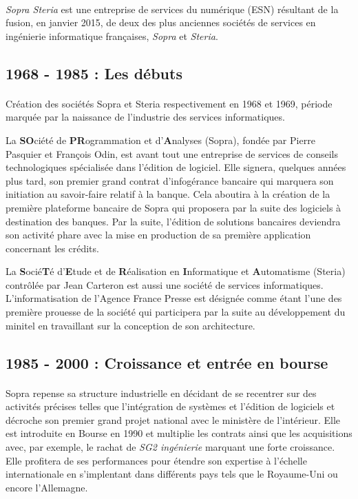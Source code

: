 \paragraph{}
\textit{Sopra Steria} est une entreprise de services du numérique (ESN) résultant de la fusion, en janvier 2015, de deux des plus anciennes sociétés de services en ingénierie informatique françaises, \textit{Sopra} et \textit{Steria}.

\subsection{1968 - 1985 : Les débuts}

\paragraph{}
Création des sociétés Sopra et Steria respectivement en 1968 et 1969, période marquée par la naissance de l'industrie des services informatiques.

La \textbf{SO}ciété de \textbf{PR}ogrammation et d'\textbf{A}nalyses (Sopra), fondée par Pierre Pasquier et François Odin, est avant tout une entreprise de services de conseils technologiques spécialisée dans l'édition de logiciel. Elle signera, quelques années plus tard, son premier grand contrat d'infogérance bancaire qui marquera son initiation au savoir-faire relatif à la banque. Cela aboutira à la création de la première plateforme bancaire de Sopra qui proposera par la suite des logiciels à destination des banques. Par la suite, l'édition de solutions bancaires deviendra son activité phare avec la mise en production de sa première application concernant les crédits.

La \textbf{S}ocié\textbf{T}é d'\textbf{E}tude et de \textbf{R}éalisation en \textbf{I}nformatique et \textbf{A}utomatisme (Steria) contrôlée par Jean Carteron est aussi une société de services informatiques. L'informatisation de l'Agence France Presse est désignée comme étant l'une des première prouesse de la société qui participera par la suite au développement du minitel en travaillant sur la conception de son architecture.

\subsection{1985 - 2000 : Croissance et entrée en bourse}

\paragraph{}
Sopra repense sa structure industrielle en décidant de se recentrer sur des activités précises telles que l'intégration de systèmes et l'édition de logiciels et décroche son premier grand projet national avec le ministère de l'intérieur. Elle est introduite en Bourse en 1990 et multiplie les contrats ainsi que les acquisitions avec, par exemple, le rachat de \textit{SG2 ingénierie} marquant une forte croissance. Elle profitera de ses performances pour étendre son expertise à l'échelle internationale en s'implentant dans différents pays tels que le Royaume-Uni ou encore l'Allemagne.\\

